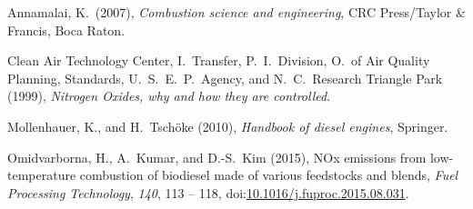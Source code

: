 \documentclass[9pt]{article}
\begin{document}
{\mdsupressbiblabel{}\begin{thebibliography}{4}%
\label{sec-bibliography}%

\mdbibitemlabel{}Annamalai, K.~(2007), \emph{Combustion science and engineering}, CRC Press/Taylor \& Francis, Boca Raton.\label{annamalai2007combustion}%

\mdbibitemlabel{}Clean Air Technology Center, I.~Transfer, P.~I.~Division, O.~of Air Quality Planning, Standards, U.~S.~E.~P.~Agency, and N.~C.~Research Triangle Park (1999), \emph{Nitrogen Oxides, why and how they are controlled}.\label{epabulletin}%

\mdbibitemlabel{}Mollenhauer, K., and H.~Tschöke (2010), \emph{Handbook of diesel engines}, Springer.\label{mollenhauer2010handbook}%

\mdbibitemlabel{}Omidvarborna, H., A.~Kumar, and D.-S.~Kim (2015), NOx emissions from low-temperature combustion of biodiesel made of various feedstocks and blends, \emph{Fuel Processing Technology}, \emph{140}, 113 – 118, doi:\href{https://dx.doi.org/10.1016/j.fuproc.2015.08.031}{10.1016/j.fuproc.2015.08.031}.\label{omidvarborna2015113}%
\par%
\end{thebibliography}}%
\end{document}
